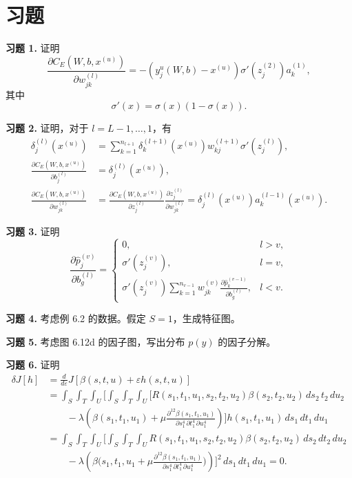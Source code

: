 \clearpage
\section*{习题}

\noindent\textbf{习题 1.} 证明
\[
\frac{\partial C_E(W,b,x^{(u)})}{\partial w_{jk}^{(l)}}=-(y_j^u(W,b)-x^{(u)})\sigma'(z_j^{(2)})a_k^{(1)},
\]
其中
\[
\sigma'(x)=\sigma(x)(1-\sigma(x)).
\]

\noindent\textbf{习题 2.} 证明，对于 $l=L-1,\ldots,1$，有
\[
\begin{aligned}
\delta_j^{(l)}(x^{(u)})&=\sum_{k=1}^{n_{l+1}}\delta_k^{(l+1)}(x^{(u)})w_{kj}^{(l+1)}\sigma'(z_j^{(l)}),\\
\frac{\partial C_E(W,b,x^{(u)})}{\partial b_j^{(l)}}&=\delta_j^{(l)}(x^{(u)}),\\
\frac{\partial C_E(W,b,x^{(u)})}{\partial w_{jk}^{(l)}}&=\frac{\partial C_E(W,b,x^{(u)})}{\partial z_j^{(l)}}\frac{\partial z_j^{(l)}}{\partial w_{jk}^{(l)}}=\delta_j^{(l)}(x^{(u)})a_k^{(l-1)}(x^{(u)}).
\end{aligned}
\]

\noindent\textbf{习题 3.} 证明
\[
\frac{\partial\widehat p_j^{(v)}}{\partial b_g^{(l)}}=\begin{cases}
0,&l>v,\\
\sigma'(z_j^{(v)}),&l=v,\\
\sigma'(z_j^{(v)})\displaystyle\sum_{k=1}^{n_{v-1}}w_{jk}^{(v)}\frac{\partial\widehat p_k^{(v-1)}}{\partial b_g^{(l)}},&l<v.
\end{cases}
\]

\noindent\textbf{习题 4.} 考虑例 6.2 的数据。假定 $S=1$，生成特征图。

\noindent\textbf{习题 5.} 考虑图 6.12d 的因子图，写出分布 $p(y)$ 的因子分解。

\clearpage
\noindent\textbf{习题 6.} 证明
\[
\begin{aligned}
\delta J[h]&=\frac d{d\varepsilon}J[\beta(s,t,u)+\varepsilon h(s,t,u)]\\
&=\int_S\int_T\int_U\Biggl[\int_S\int_T\int_U\Biggl[R(s_1,t_1,u_1,s_2,t_2,u_2)\beta(s_2,t_2,u_2)\,ds_2\,t_2\,du_2\\
&\qquad-\lambda\left(\beta(s_1,t_1,u_1)+\mu\frac{\partial^{12}\beta(s_1,t_1,u_1)}{\partial s_1^4\,\partial t_1^4\,\partial u_1^4}\right)\Biggr]h(s_1,t_1,u_1)\,ds_1\,dt_1\,du_1\\
&=\int_S\int_T\int_U\Biggl[\int_S\int_T\int_U R(s_1,t_1,u_1,s_2,t_2,u_2)\beta(s_2,t_2,u_2)\,ds_2\,dt_2\,du_2\\
&\qquad-\lambda\left(\beta\biggl(s_1,t_1,u_1+\mu\frac{\partial^{12}\beta(s_1,t_1,u_1)}{\partial s_1^4\,\partial t_1^4\,\partial u_1^4}\biggr)\right)\Biggr]^2\,ds_1\,dt_1\,du_1=0.
\end{aligned}
\]

